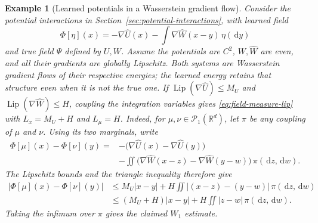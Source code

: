 \documentclass[11pt]{amsart}
\numberwithin{equation}{section}
\theoremstyle{plain}
\newtheorem{example}[theorem]{Example}
\newcommand{\R}{\mathbb{R}}
\newcommand{\cP}{\mathcal{P}}
\newcommand{\dd}{\,\mathrm{d}}
\newcommand{\abs}[1]{\left\lvert#1\right\rvert}
\DeclareMathOperator{\Lip}{Lip}
\begin{document}
\begin{example}[Learned potentials in a Wasserstein gradient flow]
\label{ex:potential-trajectory-L2}
Consider the potential interactions in
Section~\ref{sec:potential-interactions}, with learned field
\[
 \Phi[\eta](x)
 =-\nabla\widehat U(x)-\int\nabla\widehat W(x-y)\,\eta(\dd y)
\]
and true field $\Psi$ defined by $U,W$.  Assume the potentials are $C^2$,
$W,\widehat W$ are even, and all their gradients are globally Lipschitz.
Both systems are Wasserstein gradient flows of their respective energies;
the learned energy retains that structure even when it is not the true one.
If $\Lip(\nabla\widehat U)\leq M_U$ and
$\Lip(\nabla\widehat W)\leq H$, coupling the integration variables gives
\eqref{eq:field-measure-lip} with $L_x=M_U+H$ and $L_\mu=H$.
Indeed, for $\mu,\nu\in\cP_1(\R^d)$, let $\pi$ be any coupling of
$\mu$ and $\nu$.  Using its two marginals, write
\[
\begin{aligned}
 \Phi[\mu](x)-\Phi[\nu](y)
 ={}&-\bigl(\nabla\widehat U(x)-\nabla\widehat U(y)\bigr)\\
 &-\iint\bigl(\nabla\widehat W(x-z)
              -\nabla\widehat W(y-w)\bigr)\,\pi(\dd z,\dd w).
\end{aligned}
\]
The Lipschitz bounds and the triangle inequality therefore give
\[
\begin{aligned}
 \abs{\Phi[\mu](x)-\Phi[\nu](y)}
 &\leq M_U\abs{x-y}
       +H\iint\abs{(x-z)-(y-w)}\,\pi(\dd z,\dd w)\\
 &\leq(M_U+H)\abs{x-y}
       +H\iint\abs{z-w}\,\pi(\dd z,\dd w).
\end{aligned}
\]
Taking the infimum over $\pi$ gives the claimed $W_1$ estimate.




\end{example}
\end{document}

